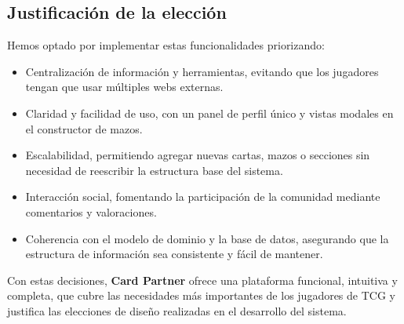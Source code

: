 \documentclass[10pt]{article}
\begin{document}
		\subsection{Justificación de la elección}
			Hemos optado por implementar estas funcionalidades priorizando:

			\begin{itemize}
				\item Centralización de información y herramientas, evitando que los jugadores tengan que usar múltiples webs externas.
				\item Claridad y facilidad de uso, con un panel de perfil único y vistas modales en el constructor de mazos.
				\item Escalabilidad, permitiendo agregar nuevas cartas, mazos o secciones sin necesidad de reescribir la estructura base del sistema.
				\item Interacción social, fomentando la participación de la comunidad mediante comentarios y valoraciones.
				\item Coherencia con el modelo de dominio y la base de datos, asegurando que la estructura de información sea consistente y fácil de mantener.
			\end{itemize}

			Con estas decisiones, \textbf{Card Partner} ofrece una plataforma funcional, intuitiva y completa, que cubre las necesidades más importantes de los jugadores de TCG y justifica las elecciones de diseño realizadas en el desarrollo del sistema.
				
\end{document}
